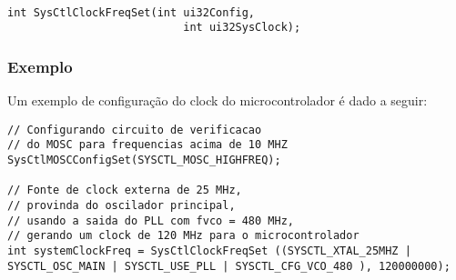 \begin{description}
\begin{description}
	\end{description}
	
\end{description}

\begin{lstlisting}[style=funcao]
	
\end{lstlisting}


\begin{lstlisting}[style=funcao]
	int SysCtlClockFreqSet(int ui32Config,
						   int ui32SysClock);
\end{lstlisting}








\subsubsection{Exemplo}

Um exemplo de configuração do clock do microcontrolador é dado a seguir:

\begin{lstlisting}[style=citacao]
// Configurando circuito de verificacao 
// do MOSC para frequencias acima de 10 MHZ
SysCtlMOSCConfigSet(SYSCTL_MOSC_HIGHFREQ);

// Fonte de clock externa de 25 MHz,
// provinda do oscilador principal,
// usando a saida do PLL com fvco = 480 MHz,
// gerando um clock de 120 MHz para o microcontrolador
int systemClockFreq = SysCtlClockFreqSet ((SYSCTL_XTAL_25MHZ | SYSCTL_OSC_MAIN | SYSCTL_USE_PLL | SYSCTL_CFG_VCO_480 ), 120000000);
\end{lstlisting}

